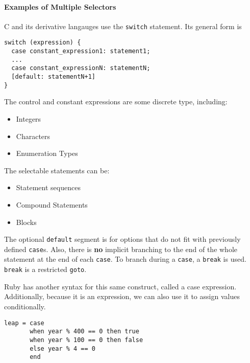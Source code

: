 \paragraph{Examples of Multiple Selectors}\label{par:N_Way_Selection-Examples}
C and its derivative langauges use the \texttt{switch} statement.
Its general form is
\begin{verbatim}
switch (expression) {
  case constant_expression1: statement1;
  ...
  case constant_expressionN: statementN;
  [default: statementN+1]
}
\end{verbatim}
The control and constant expressions are some discrete type, including:
\begin{itemize}[noitemsep]
\item Integers
\item Characters
\item Enumeration Types
\end{itemize}

The selectable statements can be:
\begin{itemize}[noitemsep]
\item Statement sequences
\item Compound Statements
\item Blocks
\end{itemize}

The optional \texttt{default} segment is for options that do not fit with previously defined \texttt{case}s.
Also, there is \textbf{no} implicit branching to the end of the whole statement at the end of each \texttt{case}.
To branch during a \texttt{case}, a \texttt{break} is used.
\texttt{break} is a restricted \texttt{goto}.

Ruby has another syntax for this same construct, called a case expression.
Additionally, because it is an expression, we can also use it to assign values conditionally.
\begin{verbatim}
leap = case
       when year % 400 == 0 then true
       when year % 100 == 0 then false
       else year % 4 == 0
       end
\end{verbatim}

